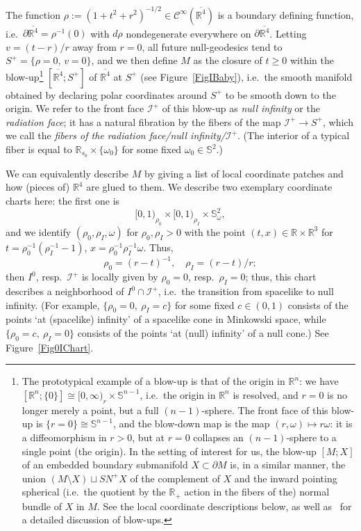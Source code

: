 \documentclass[reqno,11pt,letterpaper]{amsart}
\numberwithin{equation}{section}
\numberwithin{figure}{section}
\theoremstyle{definition}
\theoremstyle{remark}
\newcommand{\mc}{\mathcal}
\newcommand{\cC}{\mc C}
\newcommand{\ms}{\mathscr}
\newcommand{\scri}{\ms I}
\newcommand{\R}{\mathbb{R}}
\newcommand{\Sph}{\mathbb{S}}
\newcommand{\ol}{\overline}
\newcommand{\pa}{\partial}
\newcommand{\CI}{\cC^\infty}
\begin{document}
The function $\rho:=(1+t^2+r^2)^{-1/2}\in\CI(\ol{\R^4})$ is a boundary defining function, i.e.\ $\pa\ol{\R^4}=\rho^{-1}(0)$ with $d\rho$ nondegenerate everywhere on $\pa\ol{\R^4}$. Letting $v=(t-r)/r$ away from $r=0$, all future null-geodesics tend to $S^+=\{\rho=0,\,v=0\}$, and we then define $M$ as the closure of $t\geq 0$ within the blow-up\footnote{The prototypical example of a blow-up is that of the origin in $\R^n$: we have $[\R^n;\{0\}]\cong[0,\infty)_r\times\Sph^{n-1}$, i.e.\ the origin in $\R^n$ is resolved, and $r=0$ is no longer merely a point, but a full $(n-1)$-sphere. The front face of this blow-up is $\{r=0\}\cong\Sph^{n-1}$, and the blow-down map is the map $(r,\omega)\mapsto r\omega$: it is a diffeomorphism in $r>0$, but at $r=0$ collapses an $(n-1)$-sphere to a single point (the origin). In the setting of interest for us, the blow-up $[M;X]$ of an embedded boundary submanifold $X\subset\pa M$ is, in a similar manner, the union $(M\setminus X)\sqcup S N^+X$ of the complement of $X$ and the inward pointing spherical (i.e.\ the quotient by the $\R_+$ action in the fibers of the) normal bundle of $X$ in $M$. See the local coordinate descriptions below, as well as~\cite[Chapter~5]{MelroseDiffOnMwc} for a detailed discussion of blow-ups.} $[\ol{\R^4};S^+]$ of $\ol{\R^4}$ at $S^+$ (see Figure~\ref{FigIBaby}), i.e.\ the smooth manifold obtained by declaring polar coordinates around $S^+$ to be smooth down to the origin. We refer to the front face $\scri^+$ of this blow-up as \emph{null infinity} or the \emph{radiation face}; it has a natural fibration by the fibers of the map $\scri^+\to S^+$, which we call the \emph{fibers of the radiation face/null infinity/$\scri^+$}. (The interior of a typical fiber is equal to $\R_{s_0}\times\{\omega_0\}$ for some fixed $\omega_0\in\Sph^2$.)

We can equivalently describe $M$ by giving a list of local coordinate patches and how (pieces of) $\R^4$ are glued to them. We describe two exemplary coordinate charts here: the first one is
\[
  [0,1)_{\rho_0} \times [0,1)_{\rho_I} \times \Sph^2_\omega,
\]
and we identify $(\rho_0,\rho_I,\omega)$ for $\rho_0,\rho_I>0$ with the point $(t,x)\in\R\times\R^3$ for $t=\rho_0^{-1}(\rho_I^{-1}-1)$, $x=\rho_0^{-1}\rho_I^{-1}\omega$. Thus,
\begin{equation}
\label{EqISysLin0IChart}
  \rho_0 = (r-t)^{-1},\quad
  \rho_I = (r-t)/r;
\end{equation}
then $I^0$, resp.\ $\scri^+$ is locally given by $\rho_0=0$, resp.\ $\rho_I=0$; thus, this chart describes a neighborhood of $I^0\cap\scri^+$, i.e.\ the transition from spacelike to null infinity. (For example, $\{\rho_0=0,\ \rho_I=c\}$ for some fixed $c\in(0,1)$ consists of the points `at (spacelike) infinity' of a spacelike cone in Minkowski space, while $\{\rho_0=c,\ \rho_I=0\}$ consists of the points `at (null) infinity' of a null cone.) See Figure~\ref{Fig0IChart}.
\end{document}
